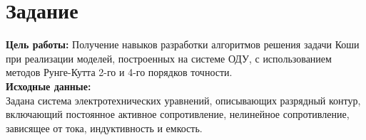 \newpage
\section*{Задание}
\large
\textbf{Цель работы: }Получение навыков разработки  алгоритмов решения задачи Коши при реализации моделей, построенных на системе ОДУ, с использованием методов Рунге-Кутта 2-го и 4-го порядков точности.\\
\textbf{Исходные данные:}\\
Задана система электротехнических уравнений, описывающих разрядный контур, включающий постоянное активное сопротивление, нелинейное сопротивление, зависящее от тока, индуктивность и емкость. 

